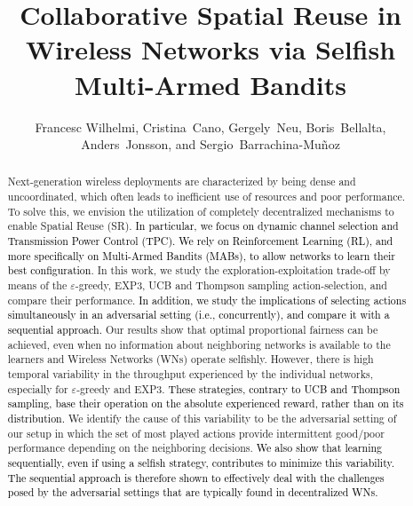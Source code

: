 \documentclass{article}
\begin{document}
		\title{Collaborative Spatial Reuse in Wireless Networks via Selfish Multi-Armed Bandits}
		\author{Francesc Wilhelmi, Cristina~Cano, Gergely~Neu, Boris~Bellalta,\\ Anders~Jonsson, and Sergio~Barrachina-Mu\~noz}
		\date{ }
		\maketitle
		\begin{abstract}
			Next-generation wireless deployments are characterized by being dense and uncoordinated, which often leads to inefficient use of resources and poor performance. To solve this, we envision the utilization of completely decentralized mechanisms to enable Spatial Reuse (SR). \textcolor{black}{In particular, we focus on dynamic channel selection and Transmission Power Control (TPC). We rely on Reinforcement Learning (RL), and more specifically on Multi-Armed Bandits (MABs), to allow networks to learn their best configuration}. In this work, we study the exploration-exploitation trade-off by means of the $\varepsilon$-greedy, EXP3, UCB and Thompson sampling action-selection, and compare their performance. \textcolor{black}{In addition, we study the implications of selecting actions simultaneously in an adversarial setting \textcolor{black}{(i.e., concurrently)}, \textcolor{black}{and compare it with a sequential approach}.} Our results show that optimal proportional fairness can be achieved, even when no information about neighboring networks is available to the learners and Wireless Networks (WNs) operate selfishly. However, there is high temporal variability in the throughput experienced by the individual networks, especially for $\varepsilon$-greedy and EXP3. \textcolor{black}{These strategies, contrary to UCB and Thompson sampling, base their operation on the absolute experienced reward, rather than on its distribution.} We identify the cause of this variability to be the adversarial setting of our setup in which the set of most played actions provide intermittent good/poor performance depending on the neighboring decisions. \textcolor{black}{We also show that \textcolor{black}{learning sequentially, even if using a selfish strategy,} contributes to minimize this variability. \textcolor{black}{The sequential approach is therefore shown to effectively deal with the challenges posed by the adversarial settings that are typically found in decentralized WNs.}}%
		\end{abstract}
	
\end{document}
